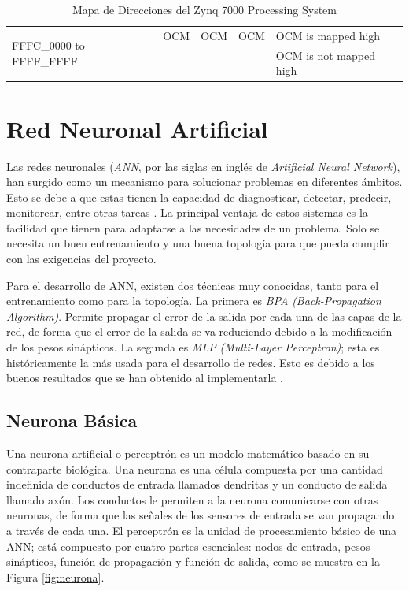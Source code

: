 \begin{table}[H]
{\begin{tabular}{|l|c|c|c|l|}
\multirow{2}{*}{FFFC\_0000 to FFFF\_FFFF}   & OCM                 & OCM              & OCM                        & OCM is mapped high                                                                              \\ \cline{2-5} 
                                            &                     &                  &                            & OCM is not mapped high                                                                          \\ \hline
\end{tabular}
}
\caption{Mapa de Direcciones del Zynq 7000 Processing System \citep{TRM2017}}
\label{tab:DIR}
\end{table}

\section{Red Neuronal Artificial}

Las redes neuronales (\textit{ANN}, por las siglas en inglés de \textit{Artificial Neural Network}), han surgido como un mecanismo para solucionar problemas en diferentes ámbitos. Esto se debe a que estas tienen la capacidad de diagnosticar, detectar, predecir, monitorear, entre otras tareas \citep{amato2013artificial,singh2009artificial,sivapathasekaran2010artificial,kiani2010application}. La principal ventaja de estos sistemas es la facilidad que tienen para adaptarse a las necesidades de un problema. Solo se necesita un buen entrenamiento y una buena topología para que pueda cumplir con las exigencias del proyecto.

Para el desarrollo de ANN, existen dos técnicas muy conocidas, tanto para el entrenamiento como para la topología. La primera es \textit{BPA} \textit{(Back-Propagation Algorithm)}. Permite propagar el error de la salida por cada una de las capas de la red, de forma que el error de la salida se va reduciendo debido a la modificación de los pesos sinápticos. La segunda es \textit{MLP} \textit{(Multi-Layer Perceptron)}; esta es históricamente la más usada para el desarrollo de redes. Esto es debido a los buenos resultados que se han obtenido al implementarla \citep{wilamowski2009neural}.

\subsection{Neurona Básica}

Una neurona artificial o perceptrón es un modelo matemático basado en su contraparte biológica. Una neurona es una célula compuesta por una cantidad indefinida de conductos de entrada llamados dendritas y un conducto de salida llamado axón. Los conductos le permiten a la neurona comunicarse con otras neuronas, de forma que las señales de los sensores de entrada se van propagando a través de cada una. El perceptrón es la unidad de procesamiento básico de una ANN; está compuesto por cuatro partes esenciales: nodos de entrada, pesos sinápticos, función de propagación y función de salida, como se muestra en la Figura \ref{fig:neurona}.

